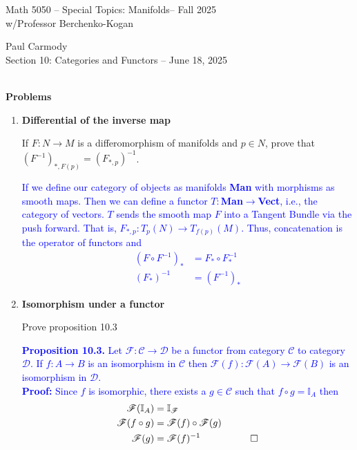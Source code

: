 \documentclass[12pt,a4paper]{report}
\newcommand{\CLASSNAME}{Math 5050 -- Special Topics: Manifolds}
\newcommand{\STUDENTNAME}{Paul Carmody}
\newcommand{\ASSIGNMENT}{Section 10: Categories and Functors }
\newcommand{\DUEDATE}{June 18, 2025}
\newcommand{\PROFESSOR}{Professor Berchenko-Kogan}
\newcommand{\SEMESTER}{Fall 2025}
\newcommand{\BLUE}[1]{\textcolor{blue}{#1}}
\begin{document}
\begin{center}
	\Large{\CLASSNAME -- \SEMESTER} \\
	\large{ w/\PROFESSOR}
\end{center}
\begin{center}
	\STUDENTNAME \\
	\ASSIGNMENT -- \DUEDATE\\
\end{center} 


\noindent \textbf{\\\large{Problems}}

\begin{enumerate}[label=10.\arabic*.]
\item \textbf{Differential of the inverse map}

If $F: N\to M$ is a differomorphism of manifolds and $p \in N$, prove that $(F^{-1})_{*,F(p)}=(F_{*,p})^{-1}$.

\BLUE{If we define our category of objects as manifolds \textbf{Man} with morphisms as smooth maps.  Then we can define a functor $T: $\textbf{Man}$\to$\textbf{Vect}, i.e., the category of vectors.  $T$ sends the smooth map $F$ into a Tangent Bundle via the push forward.   That is, $F_{*,p}: T_p(N)\to T_{f(p)}(M)$.  Thus, concatenation is the operator of functors and 
\begin{align*}
	(F \circ F^{-1})_* &= F_* \circ F^{-1}_* \\
	(F_*)^{-1} &= (F^{-1})_*
\end{align*}
}

\item  \textbf{Isomorphism under a functor}

\newcommand{\CAT}[1]{\mathscr{#1}}
\newcommand{\II}{\mathbb{I}}
Prove proposition 10.3

\BLUE{\textbf{Proposition 10.3.} Let $\CAT{F}: \CAT{C}\to \CAT{D}$ be a functor from category $\CAT{C}$ to category $\CAT{D}$. If $f: A \to B$ is an isomorphism in $\CAT{C}$ then $\CAT{F}(f): \CAT{F}(A)\to \CAT{F}(B)$ is an isomorphism in $\CAT{D}$.\\
\textbf{Proof:} Since $f$ is isomorphic, there exists a $g \in \CAT{C}$ such that $f \circ g = \II_A$ then
\begin{align*}
	\CAT{F}(\II_A) &= \II_\CAT{F} \\
	\CAT{F}(f \circ g) &= \CAT{F}(f) \circ \CAT{F}(g) \\
	\CAT{F}(g) &= \CAT{F}(f)^{-1} &\qed
\end{align*}
}


\end{enumerate}
\end{document}
